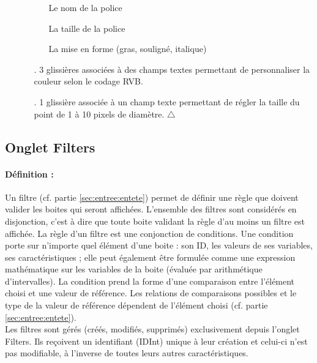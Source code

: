 \documentclass[a4paper]{article}
\begin{document}
\begin{itemize}
\begin{itemize}
    \begin{itemize}
    \item[] Le nom de la police
    \item[] La taille de la police
    \item[] La mise en forme (gras, souligné, italique)
    \end{itemize}
  \item[.] 3 glissières associées à des champs textes permettant de personnaliser la couleur selon le codage RVB.
  \item[.] 1 glissière associée à un champ texte permettant de régler la taille du point de 1 à 10 pixels de diamètre. $\triangle$
  \end{itemize}
\end{itemize}

\subsection{Onglet Filters}\label{sec:onglet:flt}
\paragraph{Définition :} Un filtre (cf. partie \ref{sec:entree:entete}) permet de définir une règle que doivent valider les boites qui seront affichées. L'ensemble des filtres sont considérés en disjonction, c'est à dire que toute boite validant la règle d'au moins un filtre est affichée. La règle d'un filtre est une conjonction de conditions. Une condition porte sur n'importe quel élément d'une boite : son ID, les valeurs de ses variables, ses caractéristiques ; elle peut également être formulée comme une expression mathématique sur les variables de la boite (évaluée par arithmétique d'intervalles). La condition prend la forme d'une comparaison entre l'élément choisi et une valeur de référence. Les relations de comparaisons possibles et le type de la valeur de référence dépendent de l'élément choisi (cf. partie \ref{sec:entree:entete}).\\Les filtres sont gérés (créés, modifiés, supprimés) exclusivement depuis l'onglet Filters. Ils reçoivent un identifiant (IDInt) unique à leur création et celui-ci n'est pas modifiable, à l'inverse de toutes leurs autres caractéristiques.
\end{document}

